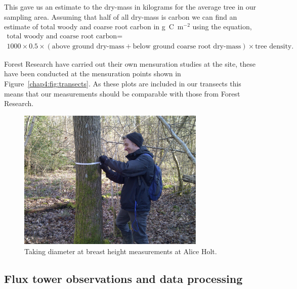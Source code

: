 This gave us an estimate to the dry-mass in kilograms for the average tree in our sampling area. Assuming that half of all dry-mass is carbon we can find an estimate of total woody and coarse root carbon in g~C~m\(^{-2}\) using the equation,
\begin{multline}
\text{total woody and coarse root carbon} =  \\1000\times0.5\times(\text{above ground dry-mass} + \text{below ground coarse root dry-mass})\times \text{tree density}.
\end{multline}

Forest Research have carried out their own mensuration studies at the site, these have been conducted at the mensuration points shown in Figure~\ref{chap4:fig:transects}. As these plots are included in our transects this means that our measurements should be comparable with those from Forest Research.  

\begin{figure}[ht]
    \centering
    \includegraphics[width=0.8\textwidth]{chapter/chapter4/dbh_me.pdf}
    \caption{Taking diameter at breast height measurements at Alice Holt.} \label{chap4:fig:dbh_me}
\end{figure}

\subsection{Flux tower observations and data processing}

